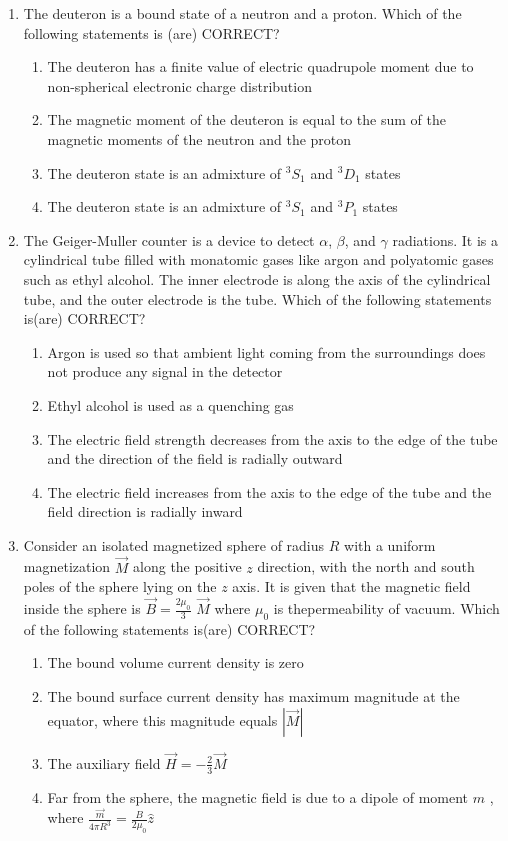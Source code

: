\documentclass[journal,12pt,onecolumn]{IEEEtran}
\theoremstyle{remark}
\begin{document}
\begin{enumerate}
\item The deuteron is a bound state of a neutron and a proton. Which of the following statements is (are) CORRECT?
\begin{enumerate}
\item The deuteron has a finite value of electric quadrupole moment due to non-spherical electronic charge distribution
\item The magnetic moment of the deuteron is equal to the sum of the magnetic moments of the neutron and the proton
\item The deuteron state is an admixture of $^{3}S_{1}$ and $^{3}D_{1}$ states
\item The deuteron state is an admixture of $^{3}S_{1}$ and $^{3}P_{1}$ states
\end{enumerate}


\item The Geiger-Muller counter is a device to detect $\alpha$, $\beta$, and $\gamma$ radiations. It is a cylindrical tube filled with monatomic gases like argon and polyatomic gases such as ethyl alcohol. The inner electrode is along the axis of the cylindrical tube, and the outer electrode is the tube. Which of the following statements is(are) CORRECT?
\begin{enumerate}
\item Argon is used so that ambient light coming from the surroundings does not produce any signal in the detector
\item Ethyl alcohol is used as a quenching gas
\item The electric field strength decreases from the axis to the edge of the tube and the direction of the field is radially outward
\item The electric field increases from the axis to the edge of the tube and the field direction is radially inward
\end{enumerate}


\item Consider an isolated magnetized sphere of radius $R$ with a uniform magnetization $\vec{M}$ along the positive $z$ direction, with the north and south poles of the sphere lying on the $z$ axis. It is given that the magnetic field inside the sphere is $\vec{B} = \frac{2\mu_{0}}{3}$ $\vec{M}$ where $\mu_{0}$ is thepermeability of vacuum. Which of the following statements is(are) CORRECT?

\begin{enumerate}
\item The bound volume current density is zero
\item The bound surface current density has maximum magnitude at the equator, where this magnitude equals $|\overrightarrow{M}|$
\item The auxiliary field $\vec{H} = -\frac{2}{3} \vec{M}$
\item Far from the sphere, the magnetic field is due to a dipole of moment $m$ , where $\frac{\vec{m}}{4\pi R^3} =\frac{B}{2\mu_{0}} \hat{z}$
\end{enumerate}



\end{enumerate}
\end{document}
